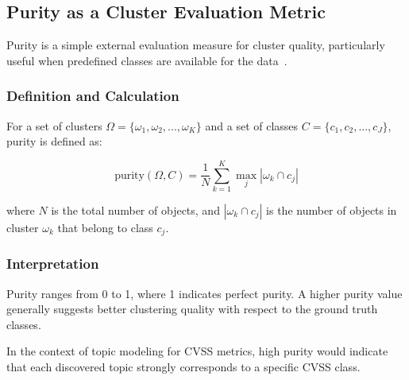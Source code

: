 \documentclass[12pt]{article}
\begin{document}
\subsection{Purity as a Cluster Evaluation Metric}\label{sec:purity}

Purity is a simple external evaluation measure for cluster quality, particularly useful when
predefined classes are available for the data~\cite{purity_usuage}.

\subsubsection{Definition and Calculation}

For a set of clusters $\Omega = \{\omega_1, \omega_2, ..., \omega_K\}$ and a set of classes $C =
	\{c_1, c_2, ..., c_J\}$, purity is defined as:

\begin{equation}
	\text{purity}(\Omega, C) = \frac{1}{N} \sum_{k=1}^K \max_j |\omega_k \cap c_j|
\end{equation}

where $N$ is the total number of objects, and $|\omega_k \cap c_j|$ is the number of objects in
cluster $\omega_k$ that belong to class $c_j$.

\subsubsection{Interpretation}

Purity ranges from 0 to 1, where 1 indicates perfect purity. A higher purity value generally
suggests better clustering quality with respect to the ground truth classes\cite{purity_info_ret}.

In the context of topic modeling for CVSS metrics, high purity would indicate that each discovered
topic strongly corresponds to a specific CVSS class.
\end{document}
